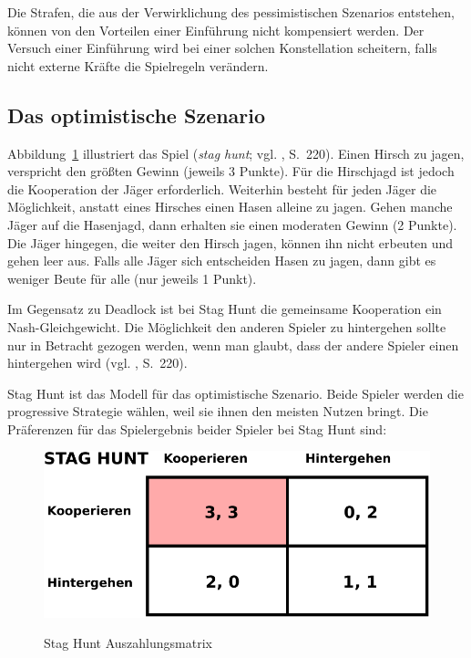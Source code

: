 Die Strafen, die aus der Verwirklichung des
pessimistischen Szenarios entstehen, können von den Vorteilen einer Einführung nicht kompensiert werden.
Der Versuch einer Einführung wird bei einer solchen Konstellation scheitern, falls nicht externe Kräfte die
Spielregeln verändern.

\subsection{Das optimistische Szenario}

Abbildung~\ref{pic:StagHunt} illustriert das Spiel \grqq{} (\emph{stag hunt}; vgl. \cite{Poundstone}, S.~220).
Einen Hirsch zu jagen, verspricht den größten Gewinn (jeweils 3 Punkte). Für die Hirschjagd ist jedoch die Kooperation der Jäger
erforderlich. Weiterhin besteht für jeden Jäger die Möglichkeit, anstatt eines Hirsches einen Hasen alleine zu jagen. Gehen manche
Jäger auf die Hasenjagd, dann erhalten sie einen moderaten Gewinn (2 Punkte). Die Jäger hingegen, die weiter den Hirsch jagen, können
ihn nicht erbeuten und gehen leer aus. Falls alle Jäger sich entscheiden Hasen zu jagen, dann gibt es weniger Beute für alle (nur jeweils
1 Punkt).

Im Gegensatz zu Deadlock ist bei Stag Hunt die gemeinsame Kooperation ein Nash-Gleichgewicht. Die Möglichkeit den anderen Spieler zu
hintergehen sollte nur in Betracht gezogen werden, wenn man glaubt, dass der andere Spieler einen hintergehen wird
(vgl. \cite{Poundstone}, S.~220).

Stag Hunt ist das Modell für das optimistische Szenario. Beide Spieler werden die progressive Strategie wählen, weil sie ihnen
den meisten Nutzen bringt. Die Präferenzen für das Spielergebnis beider Spieler bei Stag Hunt sind:

\begin{figure}%
\centering
\caption{Stag Hunt Auszahlungsmatrix}
\includegraphics[scale=0.8]{Grafiken/Stag_Hunt_Ink.pdf} 
\label{pic:StagHunt}
\end{figure}

